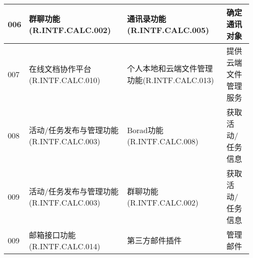 \begin{table}[htbp]
\begin{tabular}{|p{6em}|p{9em}|p{9em}|p{7em}|}
            \hline%
            006        & 群聊功能(R.INTF.CALC.002)                & 通讯录功能(R.INTF.CALC.005)               & 确定通讯对象\\
            \hline%
            007        & 在线文档协作平台(R.INTF.CALC.010)         & 个人本地和云端文件管理功能(R.INTF.CALC.013)  & 提供云端文件管理服务\\
            \hline%
            008        & 活动/任务发布与管理功能(R.INTF.CALC.003)   & Borad功能(R.INTF.CALC.008)               & 获取活动/任务信息\\
            \hline%
            009        & 活动/任务发布与管理功能(R.INTF.CALC.003)   & 群聊功能(R.INTF.CALC.002)                 & 获取活动/任务信息\\
            \hline%
            009        & 邮箱接口功能(R.INTF.CALC.014)            & 第三方邮件插件                             & 管理邮件\\
            \hline%
    \end{tabular}
\end{table}